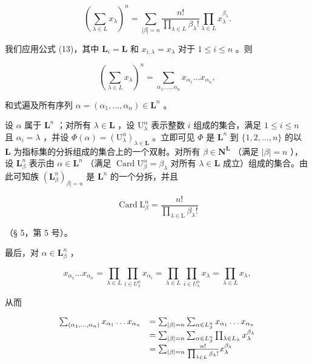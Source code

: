\[
\left(\sum_ {\lambda \in L} x _ {\lambda}\right) ^ {n} = \sum_ {| \beta | = n} \frac {n !}{\prod_ {\lambda \in L} \beta_ {\lambda} !} \prod_ {\lambda \in L} x _ {\lambda} ^ {\beta_ {\lambda}}.\tag{14}
\]

我们应用公式 (13)，其中 \(\mathbf{L}_i = \mathbf{L}\) 和 \(x_{i,\lambda} = x_{\lambda}\) 对于 \(1 \leqslant i \leqslant n\) 。则

\[
\left(\sum_ {\lambda \in L} x _ {\lambda}\right) ^ {n} = \sum_ {\alpha_ {1}, \dots , \alpha_ {n}} x _ {\alpha_ {1}} \dots x _ {\alpha_ {n}},\tag{15}
\]

和式遍及所有序列 \(\alpha = (\alpha_{1},\ldots ,\alpha_{n})\in \mathbf{L}^{n}\) 。

设 \(\alpha\) 属于 \(\mathbf{L}^n\) ；对所有 \(\lambda \in \mathbf{L}\) ，设 \(\mathrm{U}_{\lambda}^{\alpha}\) 表示整数 \(i\) 组成的集合，满足 \(1 \leqslant i \leqslant n\) 且 \(\alpha_i = \lambda\) ，并设 \(\Phi(\alpha) = (\mathrm{U}_{\lambda}^{\alpha})_{\lambda \in \mathbf{L}}\) 。立即可见 \(\Phi\) 是 \(\mathbf{L}^n\) 到 \(\{1, 2, \ldots, n\}\) 的以 \(\mathbf{L}\) 为指标集的分拆组成的集合上的一个双射。对所有 \(\beta \in \mathbf{N}^{\mathbf{L}}\) （满足 \(|\beta| = n\) ），设 \(\mathbf{L}_{\beta}^n\) 表示由 \(\alpha \in \mathbf{L}^n\) （满足 \(\operatorname{Card} \mathrm{U}_{\beta}^{\alpha} = \beta_{\lambda}\) 对所有 \(\lambda \in \mathbf{L}\) 成立）组成的集合。由此可知族 \((\mathbf{L}_{\beta}^n)_{\beta | = n}\) 是 \(\mathbf{L}^n\) 的一个分拆，并且

\[
\operatorname{Card} \mathrm{L} _ {\beta} ^ {n} = \frac {n !}{\prod_ {\lambda \in \mathrm{L}} \beta_ {\lambda} !}
\]

（§ 5，第 5 号）。

最后，对 \(\alpha \in \mathbf{L}_{\beta}^{n}\) ，

\[
x _ {\alpha_ {1}} \dots x _ {\alpha_ {n}} = \prod_ {\lambda \in L} \prod_ {i \in U _ {\lambda} ^ {\alpha}} x _ {\alpha_ {i}} = \prod_ {\lambda \in L} \prod_ {i \in U _ {\lambda} ^ {\alpha}} x _ {\lambda} = \prod_ {\lambda \in L} x _ {\lambda},
\]

从而

\[
\begin{array}{r l} \sum_ {(\alpha_ {1}, \dots , \alpha_ {n})} x _ {\alpha_ {1}} \dots x _ {\alpha_ {n}} & = \sum_ {| \beta | = n} \sum_ {\alpha \in L _ {\beta} ^ {n}} x _ {\alpha_ {1}} \dots x _ {\alpha_ {n}} \\ & = \sum_ {| \beta | = n} \sum_ {\alpha \in L _ {\beta} ^ {n}} \prod_ {\lambda \in L _ {\lambda}} x _ {\lambda} ^ {\beta_ {\lambda}} \\ & = \sum_ {| \beta | = n} \frac {n !}{\prod_ {\lambda \in L} \beta_ {\lambda} !} x _ {\lambda} ^ {\beta_ {\lambda}} \end{array}
\]

